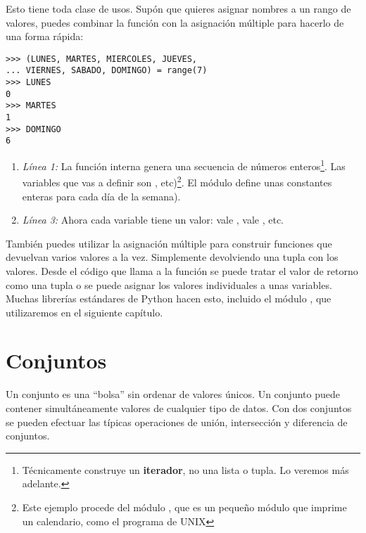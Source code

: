 Esto tiene toda clase de usos. Supón que quieres asignar nombres a un rango de valores, puedes combinar la función  con la asignación múltiple para hacerlo de una forma rápida:

\noindent\begin{minipage}{\textwidth}
\begin{lstlisting}[mathescape=True]
>>> (LUNES, MARTES, MIERCOLES, JUEVES,
... VIERNES, SABADO, DOMINGO) = range(7)
>>> LUNES
0
>>> MARTES
1
>>> DOMINGO
6
\end{lstlisting}
\end{minipage}

\begin{enumerate}

\item \emph{Línea 1:} La función interna  genera una secuencia de números enteros\footnote{Técnicamente construye un \textbf{iterador}, no una lista o tupla. Lo veremos más adelante.}. Las variables que vas a definir son , etc)\footnote{Este ejemplo procede del módulo , que es un pequeño módulo que imprime un calendario, como el programa de UNIX }. El módulo  define unas constantes enteras para cada día de la semana).

\item \emph{Línea 3:} Ahora cada variable tiene un valor:  vale ,  vale , etc.

\end{enumerate}

También puedes utilizar la asignación múltiple para construir funciones que devuelvan varios valores a la vez. Simplemente devolviendo una tupla con los valores. Desde el código que llama a la función se puede tratar el valor de retorno como una tupla o se puede asignar los valores individuales a unas variables. Muchas librerías estándares de Python hacen esto, incluido el módulo , que utilizaremos en el siguiente capítulo.

\section{Conjuntos}

Un conjunto es una ``bolsa'' sin ordenar de valores únicos. Un conjunto puede contener simultáneamente valores de cualquier tipo de datos. Con dos conjuntos se pueden efectuar las típicas operaciones de unión, intersección y diferencia de conjuntos.

